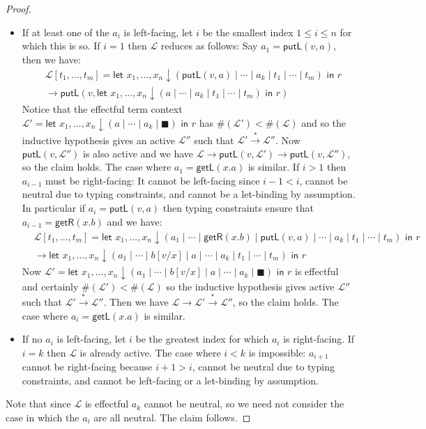 \documentclass[twoside,11pt,final]{entics}
\newcommand{\getl}{\mathsf{getL}}
\newcommand{\getr}{\mathsf{getR}}
\newcommand{\putl}{\mathsf{putL}}
\newcommand{\asn}{\downarrow}
\newcommand{\seq}{,\!\ldots\!,}
\begin{document}
\begin{proof}
\begin{itemize}
  \item If at least one of the $a_i$ is left-facing, let $i$ be the smallest index $1 \leq i \leq n$ for which this is so. If $i = 1$ then $\mathcal{L}$ reduces as follows: Say $a_1 = \putl(v,a)$, then we have:
    \begin{align*}
      & \mathcal{L}[t_1\seq t_m]
        = \textsf{let } x_1 \seq x_n \asn (\putl(v,a) \mid \cdots \mid a_k \mid t_1 \mid \cdots \mid t_m)\textsf{ in } r
      \\& \to \putl(v, \textsf{let } x_1 \seq x_n \asn (a \mid \cdots \mid a_k \mid t_1 \mid \cdots \mid t_m) \textsf{ in } r)
    \end{align*}
    Notice that the effectful term context $\mathcal{L}' = \textsf{let } x_1 \seq x_n \asn (a \mid \cdots \mid a_k \mid \blacksquare) \textsf{ in } r$ has $\#(\mathcal{L}') < \#(\mathcal{L})$ and so the inductive hypothesis gives an active $\mathcal{L}''$ such that $\mathcal{L}' \stackrel{*}{\to} \mathcal{L}''$. Now $\putl(v,\mathcal{L}'')$ is also active and we have $\mathcal{L} \to \putl(v,\mathcal{L}') \to \putl(v,\mathcal{L}'')$, so the claim holds. The case where $a_1 = \getl(x.a)$ is similar. If $i > 1$ then $a_{i-1}$ must be right-facing: It cannot be left-facing since $i-1 < i$, cannot be neutral due to typing constraints, and cannot be a let-binding by assumption. In particular if $a_i = \putl(v,a)$ then typing constraints ensure that $a_{i-1} = \getr(x.b)$ and we have:
    \begin{align*}
      & \mathcal{L}[t_1 \seq t_m]
        = \textsf{let } x_1 \seq x_n \asn (a_1 \mid \cdots \mid \getr(x.b) \mid \putl(v,a) \mid \cdots \mid a_k \mid t_1 \mid \cdots \mid t_m) \textsf{ in } r
        \\& \to \textsf{let } x_1 \seq x_n \asn (a_1 \mid \cdots \mid b[v/x] \mid a \mid \cdots \mid a_k \mid t_1 \mid \cdots \mid t_m) \textsf{ in  } r
    \end{align*}
    Now $\mathcal{L}' = \textsf{let } x_1 \seq x_n \asn (a_1 \mid \cdots \mid b[v/x] \mid a \mid \cdots \mid a_k \mid \blacksquare) \textsf{ in  } r$ is effectful and certainly $\#(\mathcal{L}') < \#(\mathcal{L})$ so the inductive hypothesis gives active $\mathcal{L}''$ such that $\mathcal{L}' \stackrel{*}{\to} \mathcal{L}''$. Then we have $\mathcal{L} \to \mathcal{L}' \stackrel{*}{\to} \mathcal{L}''$, so the claim holds. The case where $a_i = \getl(x.a)$ is similar.
  \item If no $a_i$ is left-facing, let $i$ be the greatest index for which $a_i$ is right-facing. If $i = k$ then $\mathcal{L}$ is already active. The case where $i < k$ is impossible: $a_{i+1}$ cannot be right-facing because $i+1 > i$, cannot be neutral due to typing constraints, and cannot be left-facing or a let-binding by assumption. 
  \end{itemize}
  Note that since $\mathcal{L}$ is effectful $a_k$ cannot be neutral, so we need not consider the case in which the $a_i$ are all neutral. The claim follows.
\end{proof}
\end{document}
